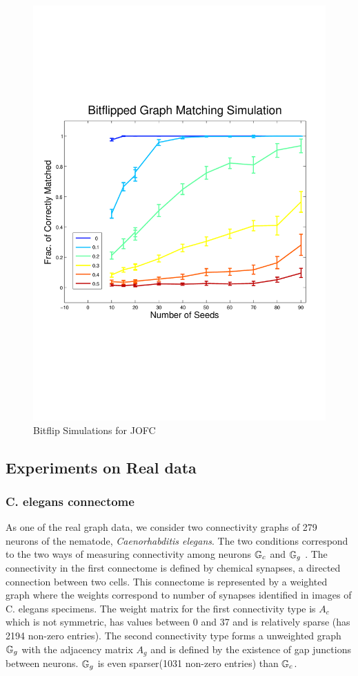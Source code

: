 \documentclass[12pt,oneside,final]{thesis}\usepackage[]{graphicx}\usepackage[]{color}
\begin{document}
\begin{figure}
\includegraphics[scale=0.75]{bitflip_JOFC}
\caption{Bitflip Simulations for JOFC \label{fig:bitflipJOFC}}
\end{figure}


\subsection{Experiments on Real data}

\subsubsection{C. elegans connectome}
As one of the real graph data, we consider two connectivity graphs of 279 neurons of the  nematode, \textit{Caenorhabditis elegans}. The two conditions correspond to the two ways of measuring connectivity among neurons $\mathbb{G}_c$ and $\mathbb{G}_g$ . The connectivity in the first connectome is defined by chemical synapses, a directed connection between two cells. This connectome is represented by a weighted graph where the weights correspond to number of synapses identified in images of C. elegans specimens.  The  weight matrix for the first connectivity type is $A_c$ which is not symmetric, has values between 0 and 37 and is relatively sparse (has 2194 non-zero entries). The second connectivity type forms a unweighted graph $\mathbb{G}_g$ with the adjacency matrix $A_g$ and is defined by the existence of gap junctions between neurons. $\mathbb{G}_g$ is even sparser(1031 non-zero entries) than $\mathbb{G}_c$.
\end{document}

